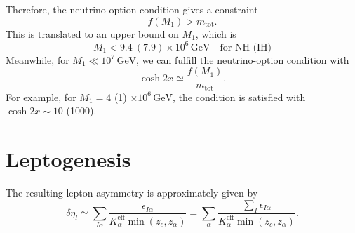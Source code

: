 \documentclass[a4paper,11pt,captions=tableheading,DIV=12]{scrartcl}
\numberwithin{equation}{section}
\newcommand\unit[1]{\,\mathrm{#1}\xspace}
\newcommand\GeV{\unit{GeV}}
\newcommand\mtot{m_{\mathrm{tot}}}
\begin{document}
Therefore, the neutrino-option condition gives a constraint
\begin{equation}
 f(M_1) > \mtot.
\end{equation}
This is translated to an upper bound on $M_1$, which is
\begin{equation}
 M_1<9.4\ (7.9)\times10^6\GeV\quad\text{for NH (IH)}
\end{equation}
Meanwhile, for $M_1\ll10^7\GeV$, we can fulfill the neutrino-option condition with
\begin{equation}
 \cosh2x\simeq \frac{f(M_1)}{\mtot}.
\end{equation}
For example, for $M_1=4$ (1) $\times10^6\GeV$, the condition is satisfied with $\cosh2x \sim 10$ (1000).


\section{Leptogenesis}
The resulting lepton asymmetry is approximately given by
\begin{equation}
 \delta \eta_l\simeq
\sum_{I\alpha}\frac{\epsilon_{I\alpha}}{K_\alpha^{\mathrm{eff}}\min(z_c,z_\alpha)}=
\sum_{\alpha}\frac{\sum_I\epsilon_{I\alpha}}{K_\alpha^{\mathrm{eff}}\min(z_c,z_\alpha)}.
\end{equation}
\end{document}
